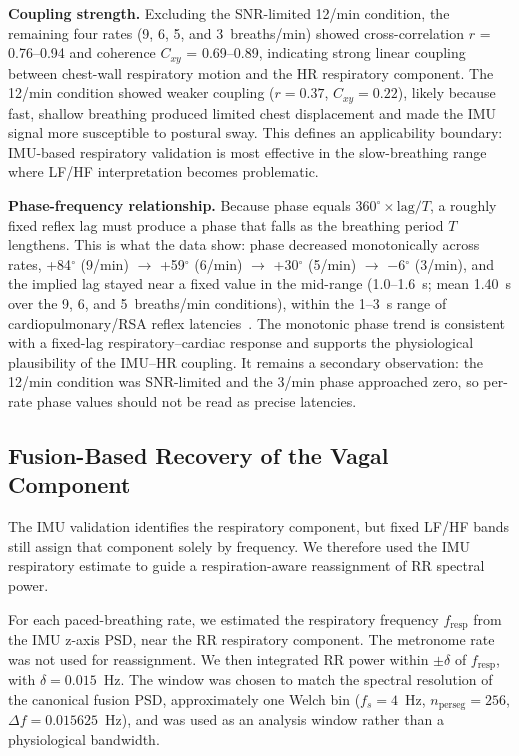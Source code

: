 \documentclass[11pt,a4paper]{article}
\begin{document}
\textbf{Coupling strength.} Excluding the SNR-limited 12/min condition,
the remaining four rates (9, 6, 5, and 3~breaths/min) showed
cross-correlation $r$ = 0.76--0.94 and coherence $C_{xy}$ = 0.69--0.89,
indicating strong linear coupling between chest-wall respiratory motion
and the HR respiratory component. The 12/min condition showed weaker coupling ($r = 0.37$, $C_{xy} = 0.22$),
likely because fast, shallow breathing produced limited chest displacement
and made the IMU signal more susceptible to postural sway. This defines an applicability boundary: IMU-based respiratory validation
is most effective in the slow-breathing range where LF/HF interpretation
becomes problematic.

\textbf{Phase-frequency relationship.} Because phase equals
$360^{\circ}\times\text{lag}/T$, a roughly fixed reflex lag must produce a
phase that falls as the breathing period $T$ lengthens. This is what the data
show: phase decreased monotonically across rates, +84$^{\circ}$ (9/min)
$\to$ +59$^{\circ}$ (6/min) $\to$ +30$^{\circ}$ (5/min) $\to$
$-$6$^{\circ}$ (3/min), and the implied lag stayed near a fixed value in the
mid-range (1.0--1.6~s; mean 1.40~s over the 9, 6, and 5~breaths/min
conditions), within the 1--3~s range of cardiopulmonary/RSA reflex
latencies~\cite{hirsch1981}. The monotonic phase trend is consistent with
a fixed-lag respiratory--cardiac response and supports the physiological
plausibility of the IMU--HR coupling. It remains a secondary observation:
the 12/min condition was SNR-limited and the 3/min phase approached zero,
so per-rate phase values should not be read as precise latencies.

\subsection{Fusion-Based Recovery of the Vagal Component}
\label{sec:fusion}

The IMU validation identifies the respiratory component, but fixed LF/HF
bands still assign that component solely by frequency. We therefore used
the IMU respiratory estimate to guide a respiration-aware reassignment of
RR spectral power.

For each paced-breathing rate, we estimated the respiratory frequency
$f_{\mathrm{resp}}$ from the IMU z-axis PSD, near the RR respiratory
component. The metronome rate was not used for reassignment. We then
integrated RR power within $\pm \delta$ of $f_{\mathrm{resp}}$, with
$\delta = 0.015$~Hz. The window was chosen to match the spectral resolution
of the canonical fusion PSD, approximately one Welch bin ($f_s=4$~Hz,
$n_{\mathrm{perseg}}=256$, $\Delta f=0.015625$~Hz), and was used as an
analysis window rather than a physiological bandwidth.
\end{document}

